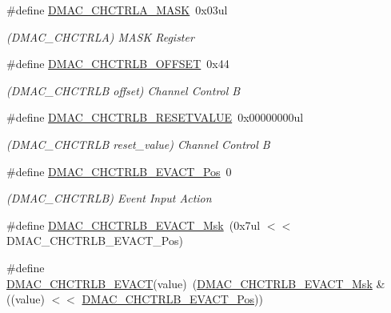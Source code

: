 \begin{DoxyCompactItemize}
\item 
\#define \mbox{\hyperlink{group___s_a_m_d21___d_m_a_c_ga51c70ebbb65a92c54c4cf17fdc5bfe4c}{D\+M\+A\+C\+\_\+\+C\+H\+C\+T\+R\+L\+A\+\_\+\+M\+A\+SK}}~0x03ul
\begin{DoxyCompactList}\small\item\em (D\+M\+A\+C\+\_\+\+C\+H\+C\+T\+R\+LA) M\+A\+SK Register \end{DoxyCompactList}\item 
\#define \mbox{\hyperlink{group___s_a_m_d21___d_m_a_c_ga2e5586eda8c80583dfeab044201ecc14}{D\+M\+A\+C\+\_\+\+C\+H\+C\+T\+R\+L\+B\+\_\+\+O\+F\+F\+S\+ET}}~0x44
\begin{DoxyCompactList}\small\item\em (D\+M\+A\+C\+\_\+\+C\+H\+C\+T\+R\+LB offset) Channel Control B \end{DoxyCompactList}\item 
\#define \mbox{\hyperlink{group___s_a_m_d21___d_m_a_c_gaf06e5882e27840def52cff8c15867a60}{D\+M\+A\+C\+\_\+\+C\+H\+C\+T\+R\+L\+B\+\_\+\+R\+E\+S\+E\+T\+V\+A\+L\+UE}}~0x00000000ul
\begin{DoxyCompactList}\small\item\em (D\+M\+A\+C\+\_\+\+C\+H\+C\+T\+R\+LB reset\+\_\+value) Channel Control B \end{DoxyCompactList}\item 
\#define \mbox{\hyperlink{group___s_a_m_d21___d_m_a_c_ga5d582eee4f8e2bfd97709b103da6830e}{D\+M\+A\+C\+\_\+\+C\+H\+C\+T\+R\+L\+B\+\_\+\+E\+V\+A\+C\+T\+\_\+\+Pos}}~0
\begin{DoxyCompactList}\small\item\em (D\+M\+A\+C\+\_\+\+C\+H\+C\+T\+R\+LB) Event Input Action \end{DoxyCompactList}\item 
\#define \mbox{\hyperlink{group___s_a_m_d21___d_m_a_c_gaf77b8385ed5e2dff5e120a2097e06ef0}{D\+M\+A\+C\+\_\+\+C\+H\+C\+T\+R\+L\+B\+\_\+\+E\+V\+A\+C\+T\+\_\+\+Msk}}~(0x7ul $<$$<$ D\+M\+A\+C\+\_\+\+C\+H\+C\+T\+R\+L\+B\+\_\+\+E\+V\+A\+C\+T\+\_\+\+Pos)
\item 
\#define \mbox{\hyperlink{group___s_a_m_d21___d_m_a_c_ga729f0b50baa75b9d5a994739a89aa660}{D\+M\+A\+C\+\_\+\+C\+H\+C\+T\+R\+L\+B\+\_\+\+E\+V\+A\+CT}}(value)~(\mbox{\hyperlink{group___s_a_m_d21___d_m_a_c_gaf77b8385ed5e2dff5e120a2097e06ef0}{D\+M\+A\+C\+\_\+\+C\+H\+C\+T\+R\+L\+B\+\_\+\+E\+V\+A\+C\+T\+\_\+\+Msk}} \& ((value) $<$$<$ \mbox{\hyperlink{group___s_a_m_d21___d_m_a_c_ga5d582eee4f8e2bfd97709b103da6830e}{D\+M\+A\+C\+\_\+\+C\+H\+C\+T\+R\+L\+B\+\_\+\+E\+V\+A\+C\+T\+\_\+\+Pos}}))

\end{DoxyCompactItemize}
